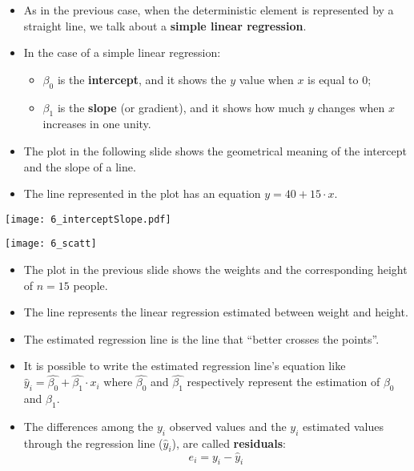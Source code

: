 \begin{frame}
  \begin{itemize}
    \item As in the previous case, when the deterministic element is represented by a straight line, we talk about a \textbf{simple linear regression}. 
    \vspace{0.2cm}
    \item In the case of a simple linear regression:
    \begin{itemize}
      \item $ \beta_0 $ is the \textbf{intercept}, and it shows the $ y $ value when $ x $ is equal to $ 0 $;
      \item $ \beta_1 $ is the \textbf{slope} (or gradient), and it shows how much $ y $ changes when $ x $ increases in one unity.
    \end{itemize}
    \vspace{0.2cm}
    \item The plot in the following slide shows the geometrical meaning of the intercept and the slope of a line.
    \vspace{0.2cm}
    \item The line represented in the plot has an equation $ y = 40 + 15 \cdot x $.
  \end{itemize}
\end{frame}

\begin{frame}
  \begin{center}
    \texttt{[image: 6\_interceptSlope.pdf]}
  \end{center}
\end{frame}

\begin{frame}
  \begin{center}
    \texttt{[image: 6\_scatt]}
  \end{center}
\end{frame}

\begin{frame}
  \begin{itemize}
    \item The plot in the previous slide shows the weights and the corresponding height of $ n = 15 $ people. 
    \item The line represents the linear regression estimated between weight and height.
    \item The estimated regression line is the line that ``better crosses the points''.
    \item It is possible to write the estimated regression line's equation like $ \hat{y}_i = \hat{\beta_0} + \hat{\beta_1} \cdot x_i $ where $ \hat{\beta_0} $ and $ \hat{\beta_1} $ respectively represent the estimation of $ \beta_0 $ and $ \beta_1 $.
    \item The differences among the $ y_i $ observed values and the $ y_i $ estimated values through the regression line ($ \hat{y}_i $), are called \textbf{residuals}: \vspace{-0.5cm} $$ e_i = y_i - \hat{y}_i $$
  \end{itemize}
\end{frame}
    
